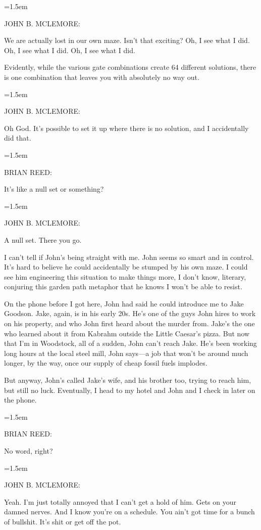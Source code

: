 \documentclass[10pt,a4paper]{article}
\newcommand{\speakerlabel}[1]{{\plantin\color{speakerblue}\MakeUppercase{#1}:}}
\newenvironment{speech}[1]{%
		\par\medskip
		\begin{list}{}{%
			\leftmargin=1.5em
			\rightmargin=0pt
			\topsep=0pt
			\partopsep=0pt
			\parsep=0.5\baselineskip
			\itemsep=0pt}%
		\item\speakerlabel{#1}\enspace\ignorespaces
	}{\end{list}}
\newenvironment{narration}[1]{%
		\par\medskip\noindent\speakerlabel{#1}\enspace\ignorespaces
	}{\par\medskip}
\begin{document}
\begin{speech}{JOHN B. McLEMORE}
We are actually lost in our own maze. Isn't that exciting? Oh, I see what I did. Oh, I see what I did. Oh, I see what I did.
\end{speech}
\begin{narration}{BRIAN REED}
Evidently, while the various gate combinations create 64 different solutions, there is one combination that leaves you with absolutely no way out.
\end{narration}
\begin{speech}{JOHN B. McLEMORE}
Oh God. It's possible to set it up where there is no solution, and I accidentally did that.
\end{speech}
\begin{speech}{BRIAN REED}
It's like a null set or something?
\end{speech}
\begin{speech}{JOHN B. McLEMORE}
A null set. There you go.
\end{speech}
\begin{narration}{BRIAN REED}
I can't tell if John's being straight with me. John seems so smart and in control. It's hard to believe he could accidentally be stumped by his own maze. I could see him engineering this situation to make things more, I don't know, literary, conjuring this garden path metaphor that he knows I won't be able to resist.

On the phone before I got here, John had said he could introduce me to Jake Goodson. Jake, again, is in his early 20s. He's one of the guys John hires to work on his property, and who John first heard about the murder from. Jake's the one who learned about it from Kabrahm outside the Little Caesar's pizza. But now that I'm in Woodstock, all of a sudden, John can't reach Jake. He's been working long hours at the local steel mill, John says—a job that won't be around much longer, by the way, once our supply of cheap fossil fuels implodes.

But anyway, John's called Jake's wife, and his brother too, trying to reach him, but still no luck. Eventually, I head to my hotel and John and I check in later on the phone.
\end{narration}
\begin{speech}{BRIAN REED}
No word, right?
\end{speech}
\begin{speech}{JOHN B. McLEMORE}
Yeah. I'm just totally annoyed that I can't get a hold of him. Gets on your damned nerves. And I know you're on a schedule. You ain't got time for a bunch of bullshit. It's shit or get off the pot.
\end{speech}
\end{document}
